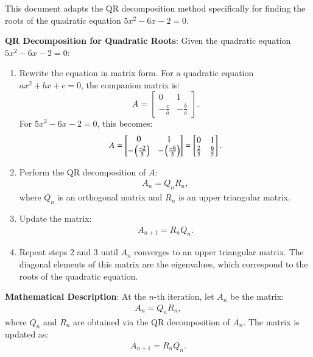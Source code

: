 \documentclass[journal]{IEEEtran}
\begin{document}
This document adapts the QR decomposition method specifically for finding the roots of the quadratic equation $5x^2 - 6x - 2 = 0$.

\textbf{QR Decomposition for Quadratic Roots}:
Given the quadratic equation $5x^2 - 6x - 2 = 0$:

\begin{enumerate}
    \item Rewrite the equation in matrix form. For a quadratic equation $ax^2 + bx + c = 0$, the companion matrix is:
    \[
    A = \begin{bmatrix}
    0 & 1 \\
    -\frac{c}{a} & -\frac{b}{a}
    \end{bmatrix}.
    \]
    For $5x^2 - 6x - 2 = 0$, this becomes:
    \[
    A = \begin{bmatrix}
    0 & 1 \\
    -\left(\frac{-2}{5}\right) & -\left(\frac{-6}{5}\right)
    \end{bmatrix} = \begin{bmatrix}
    0 & 1 \\
    \frac{2}{5} & \frac{6}{5}
    \end{bmatrix}.
    \]

    \item Perform the QR decomposition of $A$:
    \begin{align}
    A_n = Q_n R_n,
    \end{align}
    where $Q_n$ is an orthogonal matrix and $R_n$ is an upper triangular matrix.

    \item Update the matrix:
    \begin{align}
    A_{n+1} = R_n Q_n.
    \end{align}

    \item Repeat steps 2 and 3 until $A_n$ converges to an upper triangular matrix. The diagonal elements of this matrix are the eigenvalues, which correspond to the roots of the quadratic equation.
\end{enumerate}

\textbf{Mathematical Description}:
At the $n$-th iteration, let $A_n$ be the matrix:
\begin{align}
A_n = Q_n R_n,
\end{align}
where $Q_n$ and $R_n$ are obtained via the QR decomposition of $A_n$. The matrix is updated as:
\begin{align}
A_{n+1} = R_n Q_n.
\end{align}
\end{document}
